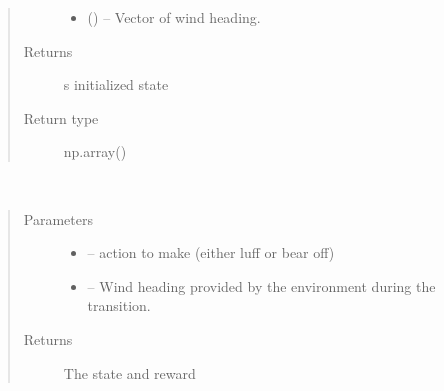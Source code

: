 \documentclass[letterpaper,10pt,english]{sphinxmanual}
\begin{document}
\begin{fulllineitems}
\begin{fulllineitems}
\begin{quote}
\begin{description}
\begin{itemize}
\item {} 
\sphinxstyleliteralstrong{(}\sphinxstyleliteralstrong{)} () -- Vector of wind heading.

\end{itemize}

\item[{Returns}] \leavevmode
s initialized state

\item[{Return type}] \leavevmode
np.array()

\end{description}\end{quote}

\end{fulllineitems}


\begin{fulllineitems}
\label{\detokenize{package1:mdp.MDP.policy}}
\end{fulllineitems}


\begin{fulllineitems}
\label{\detokenize{package1:mdp.MDP.transition}}~\begin{quote}\begin{description}
\item[{Parameters}] \leavevmode\begin{itemize}
\item {} 
 -- action to make (either luff or bear off)

\item {} 
 -- Wind heading provided by the environment during the transition.

\end{itemize}

\item[{Returns}] \leavevmode
The state and reward

\end{description}\end{quote}

\end{fulllineitems}


\end{fulllineitems}
\end{document}
